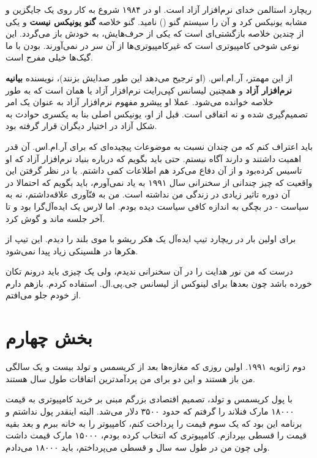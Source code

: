 ریچارد استالمن خدای نرم‌افزار آزاد است. او در
۱۹۸۴ شروع به کار روی یک جایگزین و مشابه یونیکس کرد و آن را سیستم گنو
() نامید. گنو خلاصه \textbf{گنو یونیکس نیست} و یکی از چندین خلاصه بازگشتی‌ای است که یکی از حرف‌هایش، به
خودش باز می‌گردد. این نوعی شوخی کامپیوتری است که غیرکامپیوتری‌ها از آن
سر در نمی‌آورند. بودن با ما گیک‌ها خیلی مفرح است.

از این مهمتر، آر.ام.اس. (او ترجیح می‌دهد این طور صدایش بزنند)، نویسنده
\textbf{بیانیه نرم‌افزار آزاد} و
همچنین لیسانس کپی‌رایت نرم‌افزار آزاد یا همان  است که به طور خلاصه  خوانده می‌شود. عملا او پیشرو
مفهوم نرم‌افزار آزاد به عنوان یک امر تصمیم‌گیری شده و نه اتفاقی است. قبل
از او، یونیکس اصلی بنا به یکسری حوادث به شکل آزاد در اختیار دیگران
قرار گرفته بود.

باید اعتراف کنم که من چندان نسبت به موضوعات پیچیده‌ای که برای
آر.ام.اس. آن قدر اهمیت داشتند و دارند آگاه نیستم. حتی باید بگویم که
درباره بنیاد نرم‌افزار آزاد که او تاسیس کرده‌بود و از آن دفاع می‌کرد هم
اطلاعات کمی داشتم. با در نظر گرفتن این واقعیت که چیز چندانی از سخنرانی
سال ۱۹۹۱ به یاد نمی‌آورم، باید بگویم که احتمالا در آن دوره تاثیر زیادی
در زندگی من نداشته است. من به فنّآوری علاقه‌داشتم، نه به سیاست - در
بچگی به اندازه کافی سیاست دیده بودم. اما لارس یک ایده‌آل‌گرا بود و تا
آخر جلسه ماند و گوش کرد.

برای اولین بار در ریچارد تیپ ایده‌آل یک هکر ریشو با موی بلند را
دیدم. این تیپ از هکرها در هلسینکی زیاد پیدا نمی‌شود.

درست که من نور هدایت را در آن سخنرانی ندیدم، ولی یک چیزی باید درونم
تکان خورده باشد چون بعدها برای لینوکس از لیسانس جی.پی.ال. استفاده
کردم. بازهم دارم از خودم جلو می‌افتم.

\section{بخش چهارم}
دوم ژانویه ۱۹۹۱. اولین روزی که مغازه‌ها بعد از کریسمس و تولد بیست و یک
سالگی من باز هستند و این دو برای من پردآمدترین اتفاقات طول سال هستند.

با پول کریسمس و تولد، تصمیم اقتصادی بزرگم مبنی بر خرید کامپیوتری به
قیمت ۱۸۰۰۰ مارک فنلاند را گرفتم که حدود ۳۵۰۰ دلار می‌شد. البته اینقدر
پول نداشتم و برنامه این بود که یک سوم قیمت را پرداخت کنم، کامپیوتر را
به خانه ببرم و بعد بقیه قیمت را قسطی بپردازم. کامپیوتری که انتخاب کرده
بودم، ۱۵۰۰۰ مارک قیمت داشت ولی چون من در طول سه سال و قسطی می‌پرداختم،
باید ۱۸۰۰۰ می‌دادم.

